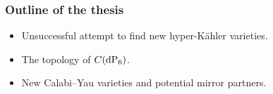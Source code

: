 \begin{frame}
\frametitle{Outline of the thesis}

\begin{itemize}
	\item Unsuccessful attempt to find new hyper-Kähler varieties.
	\item The topology of $C(\dP6)$.
	\item New Calabi--Yau varieties and potential mirror partners.
\end{itemize}

\end{frame}